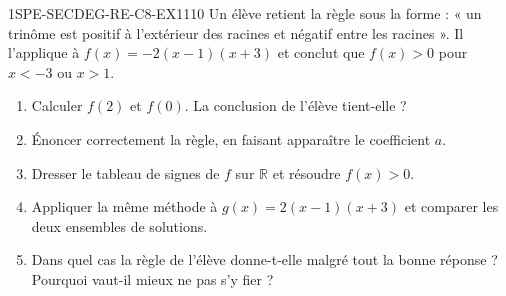 

\begin{exercice}{1SPE-SECDEG-RE-C8-EX1}{1}{10}
Un élève retient la règle sous la forme : « un trinôme est positif à l'extérieur
des racines et négatif entre les racines ». Il l'applique à
$f(x) = -2(x - 1)(x + 3)$ et conclut que $f(x) > 0$ pour $x < -3$ ou $x > 1$.
\begin{enumerate}
  \item Calculer $f(2)$ et $f(0)$. La conclusion de l'élève tient-elle ?
  \item Énoncer correctement la règle, en faisant apparaître le coefficient $a$.
  \item Dresser le tableau de signes de $f$ sur $\mathbb{R}$ et résoudre
    $f(x) > 0$.
  \item Appliquer la même méthode à $g(x) = 2(x - 1)(x + 3)$ et comparer les
    deux ensembles de solutions.
  \item Dans quel cas la règle de l'élève donne-t-elle malgré tout la bonne
    réponse ? Pourquoi vaut-il mieux ne pas s'y fier ?
\end{enumerate}
\end{exercice}


